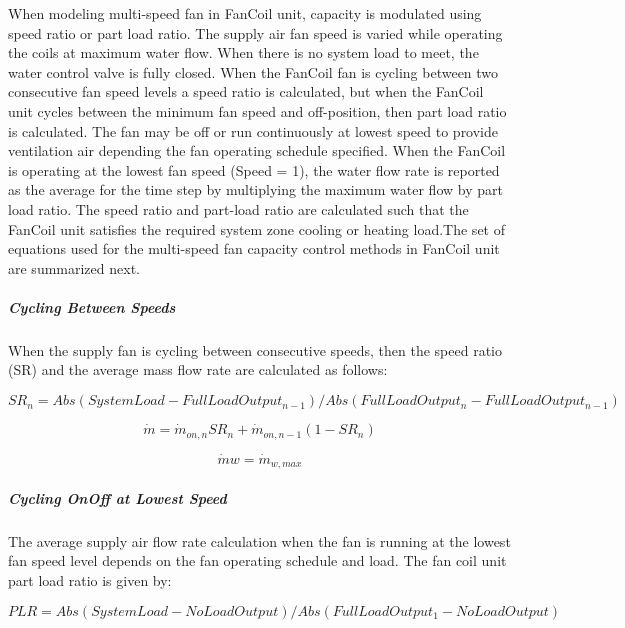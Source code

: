 When modeling multi-speed fan in FanCoil unit, capacity is modulated using speed ratio or part load ratio. The supply air fan speed is varied while operating the coils at maximum water flow. When there is no system load to meet, the water control valve is fully closed. When the FanCoil fan is cycling between two consecutive fan speed levels a speed ratio is calculated, but when the FanCoil unit cycles between the minimum fan speed and off-position, then part load ratio is calculated. The fan may be off or run continuously at lowest speed to provide ventilation air depending the fan operating schedule specified. When the FanCoil is operating at the lowest fan speed (Speed = 1), the water flow rate is reported as the average for the time step by multiplying the maximum water flow by part load ratio. The speed ratio and part-load ratio are calculated such that the FanCoil unit satisfies the required system zone cooling or heating load.The set of equations used for the multi-speed fan capacity control methods in FanCoil unit are summarized next.

\subparagraph{Cycling Between Speeds}\label{cycling-between-speeds}

When the supply fan is cycling between consecutive speeds, then the speed ratio (SR) and the average mass flow rate are calculated as follows:

\begin{equation}
  {SR_{n}} = Abs({SystemLoad} - {FullLoadOutput_{n-1}}) / Abs({FullLoadOutput_{n}} - {FullLoadOutput_{n-1}})
\end{equation}

\begin{equation}
  {\dot m} = {\dot m_{on, n}} {SR_{n}} + {\dot m_{on, n-1}} (1 - {SR_{n}})
\end{equation}

\begin{equation}
  {\dot m{w}} = {\dot m_{w, max}}
\end{equation}

\subparagraph{Cycling OnOff at Lowest Speed}\label{cycling-onoff-at-lowest-speed}

The average supply air flow rate calculation when the fan is running at the lowest fan speed level depends on the fan operating schedule and load. The fan coil unit part load ratio is given by:

\begin{equation}
{PLR} = Abs({SystemLoad} - {NoLoadOutput}) / Abs({FullLoadOutput_{1}} - {NoLoadOutput})
\end{equation}

